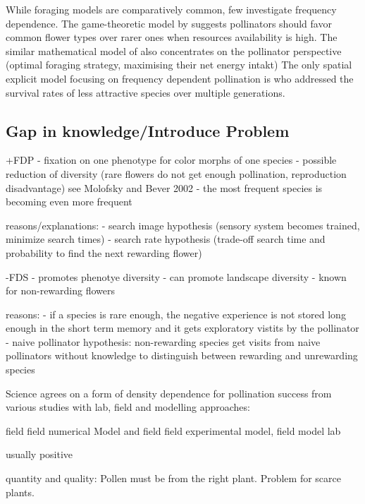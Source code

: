 While foraging models are comparatively common, few investigate frequency dependence. The game-theoretic model by \cite{kunin1996pollinator} suggests pollinators should favor common flower types over rarer ones when resources availability is high. The similar mathematical model of \cite{song2014adaptive} also concentrates on the pollinator perspective (optimal foraging strategy, maximising their net energy intakt) The only spatial explicit model focusing on frequency dependent pollination is \cite{hanoteaux2013effects} who addressed the survival rates of less attractive species over multiple generations. 

\subsection*{Gap in knowledge/Introduce Problem}


+FDP
- fixation on one phenotype for color morphs of one species
- possible reduction of diversity (rare flowers do not get enough pollination, reproduction disadvantage) see Molofsky and Bever 2002
- the most frequent species is becoming even more frequent

reasons/explanations:
- search image hypothesis (sensory system becomes trained, minimize search times)
- search rate hypothesis (trade-off search time and probability to find the next rewarding flower)

-FDS
- promotes phenotye diversity
- can promote landscape diversity
- known for non-rewarding flowers

reasons:
- if a species is rare enough, the negative experience is not stored long enough in the short term memory and it gets exploratory vistits by the pollinator
- naive pollinator hypothesis: non-rewarding species get visits from naive pollinators without knowledge to distinguish between rewarding and unrewarding species


Science agrees on a form of density dependence for pollination success from various studies with lab, field and modelling approaches:

\citep{bernhardt2008effects} field
\citep{elliott2009effects} field
\citep{essenberg2012explaining} numerical Model and field
\citep{Kunin1997} field
\citep{kunin1993sex} experimental
\citep{morris2010benefit} model, field
\citep{rands2010effects} model
\citep{stout1998influence} lab

usually positive

quantity and quality: Pollen must be from the right plant. Problem for scarce plants. 

